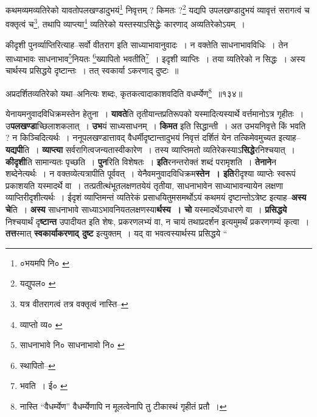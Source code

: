 \documentclass[article,12pt,a4paper]{memoir}
\begin{document}
	  \pstart कथमव्यमव्यतिरेको यावतोपलखण्डादुभयं\footnote{०भयमपि नि० \cite{dp-msD}} निवृत्तम् ? किमतः ?\footnote{यद्युपल० \cite{dp-msA} \cite{dp-msB} \cite{dp-edP} \cite{dp-edH} \cite{dp-edE}} यद्यपि उपलखण्डादुभयं व्यावृत्तं सरागत्वं च वक्तृत्वं च\footnote{यत्र वीतरागत्वं तत्र वक्तृत्वं नास्ति--\cite{dp-msD-n}}\-, तथापि व्याप्त्या\footnote{व्याप्तो व्य० \cite{dp-msC}} व्यतिरेको यस्तस्याऽसिद्धेः कारणाद् अव्यतिरेकोऽयम् ।
	\pend
       

	  \pstart कीदृशी पुनर्व्याप्तिरित्याह--सर्वो वीतराग इति साध्याभावानुवादः । न वक्तेति साधनाभावविधिः । तेन साध्याभावः साधनाभाव\footnote{साधनाभावे नि० \cite{dp-msD} साधनाभावो नि० \cite{dp-msC}}\-नियतः \footnote{स्थापितो--\cite{dp-msA}}\-ख्यापितो भवतीति\footnote{भवति । ई० \cite{dp-msD} \cite{dp-msB}} । इदृशी व्याप्तिः । तया व्यतिरेको न सिद्धः । अस्य चार्थस्य प्रसिद्धये दृष्टान्तः । तत् स्वकार्या ऽकरणाद् दुष्टः ॥
	\pend
       
	  \bigskip
	  \begingroup
	

	  \pstart अप्रदर्शितव्यतिरेको यथा--अनित्यः शब्दः, कृतकत्वादाकाशवदिति वधर्म्येण\footnote{नास्ति “वैधर्म्येण” \cite{dp-edE} वैधर्म्येणापि \cite{dp-msB} \cite{dp-msD} \cite{dp-edP} \cite{dp-edH} न मूलत्वेनापि तु टीकास्थं गृहीतं \cite{dp-edN} प्रतौ ।} ॥१३४॥
	\pend
      
	  \endgroup
	
	  \endgroup
	

	  \pstart येनायमनुवादविधिक्रमस्तेन हेतुना । \textbf{यावते}ति तृतीयान्तप्रतिरूपको यस्मादित्यस्यार्थे वर्त्तमानोऽत्र गृहीतः । उ\leavevmode{}\textbf{पलखण्डा}च्छिलाशकलात् । \textbf{उभ}यं साध्यसाधनम् । \textbf{किमत} इति सिद्धान्ती । अत उभयनिवृत्ते किं भवति ? न किञ्चिदित्यर्थः । ननूपलखण्डात्तावद् वैधर्मीदृष्टान्तादुभयं निवृत्तं दर्शितं येन तत्किमेवमुच्यत इत्याह--\textbf{यद्यपी}ति । \textbf{व्याप्त्या} सर्वरागित्वजन्यतास्वीकारेण । तस्य व्याप्तिमतो व्यतिरेकस्याऽ\textbf{सिद्धे}रनिश्चयात् । \textbf{कीदृशी}ति सामान्यतः पृच्छति । \textbf{पुन}रिति विशेषतः । \textbf{इति}रनन्तरोक्तं शब्दं परामृशति । \textbf{तेनाने}न शब्देनेत्यर्थः । न वक्तव्येत्यत्रापीति पूर्ववत् । येनैवमनुवादविधिक्रम\textbf{स्तेन । इति}रीदृश्या व्याप्तेः स्वरूपं प्रकाशयति यस्मादर्थे वा । तत्प्रतीत्थंभूतलक्षणतयेयं तृतीया, साधनाभावेन साध्याभावन्यायेन लक्षणा व्याप्तिरीदृशीत्यर्थः । ईदृशं व्याप्तिमन्तं व्यतिरेकं प्रसाधयितुमसमर्थोऽयं कथमयं दृष्टान्तोऽत्रेष्ट इत्याह--\textbf{अस्य चे}ति । \textbf{अस्य} साधनाभावे साध्याऽभावनियतलक्षणस्या\textbf{र्थस्य । चो} यस्मादर्थेऽवधारणे वा । \textbf{प्रसिद्धये} निश्चयार्थं दृ\textbf{ष्टान्त} उपादीयत इति शेषः, प्रकरणलभ्यं वा, न चायं तथाप्रदर्शन इत्यमुमर्थं प्रकरणगम्यं कृत्वा । \textbf{तत्त}स्मात् \textbf{स्वकार्याकरणाद् दुष्ट} इत्युक्तम् । यद् वा भवत्वस्यार्थस्य प्रसिद्धये          \leavevmode{} “
	  
\end{document}
